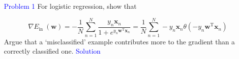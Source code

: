 \textcolor{blue}{Problem 1}
For logistic regression, show that

\begin{equation}
    \nabla E_{\text {in }}(\mathbf{w})  =-\frac{1}{N} \sum_{n=1}^{N} \frac{y_{n} \mathbf{x}_{n}}{1+e^{y_{n} \mathbf{w}^{\mathrm{T}} \mathbf{x}_{n}}}  
 =\frac{1}{N} \sum_{n=1}^{N}-y_{n} \mathbf{x}_{n} \theta\left(-y_{n} \mathbf{w}^{\mathrm{T}} \mathbf{x}_{n}\right)
\end{equation}
Argue that a `misclassified' example contributes more to the gradient than a correctly classified one.
\textcolor{blue}{Solution}















\newpage